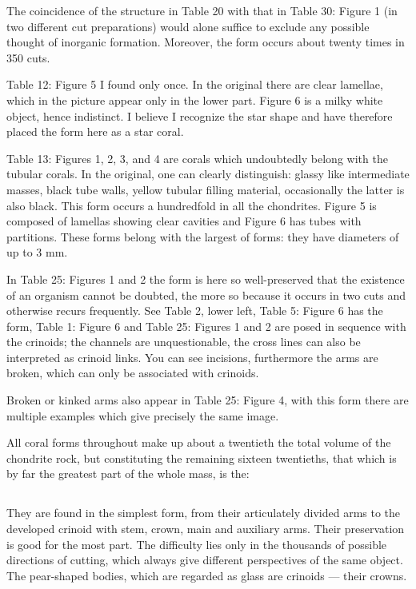 \documentclass[a4paper, 12pt, oneside]{article}
\begin{document}
The coincidence of the structure in Table 20 with that in Table 30: Figure 1 (in two different cut preparations) would alone suffice to exclude any possible thought of inorganic formation. Moreover, the form occurs about twenty times in 350 cuts.

Table 12: Figure 5 I found only once. In the original there are clear lamellae, which in the picture appear only in the lower part. Figure 6 is a milky white object, hence indistinct. I believe I recognize the star shape and have therefore placed the form here as a star coral.

Table 13: Figures 1, 2, 3, and 4 are corals which undoubtedly belong with the tubular corals. In the original, one can clearly distinguish: glassy like intermediate masses, black tube walls, yellow tubular filling material, occasionally the latter is also black. This form occurs a hundredfold in all the chondrites. Figure 5 is composed of lamellas showing clear cavities and Figure 6 has tubes with partitions. These forms belong with the largest of forms: they have diameters of up to 3 mm.

In Table 25: Figures 1 and 2 the form is here so well-preserved that the existence of an organism cannot be doubted, the more so because it occurs in two cuts and otherwise recurs frequently. See Table 2, lower left, Table 5: Figure 6 has the form, Table 1: Figure 6 and Table 25: Figures 1 and 2 are posed in sequence with the crinoids; the channels are unquestionable, the cross lines can also be interpreted as crinoid links. You can see incisions, furthermore the arms are broken, which can only be associated with crinoids.

Broken or kinked arms also appear in Table 25: Figure 4, with this form there are multiple examples which give precisely the same image.

All coral forms throughout make up about a twentieth the total volume of the chondrite rock, but constituting the remaining sixteen twentieths, that which is by far the greatest part of the whole mass, is the:
\clearpage
\subsection{}
\paragraph*{}
They are found in the simplest form, from their articulately divided arms to the developed crinoid with stem, crown, main and auxiliary arms. Their preservation is good for the most part. The difficulty lies only in the thousands of possible directions of cutting, which always give different perspectives of the same object. The pear-shaped bodies, which are regarded as glass are crinoids --- their crowns.
\end{document}
